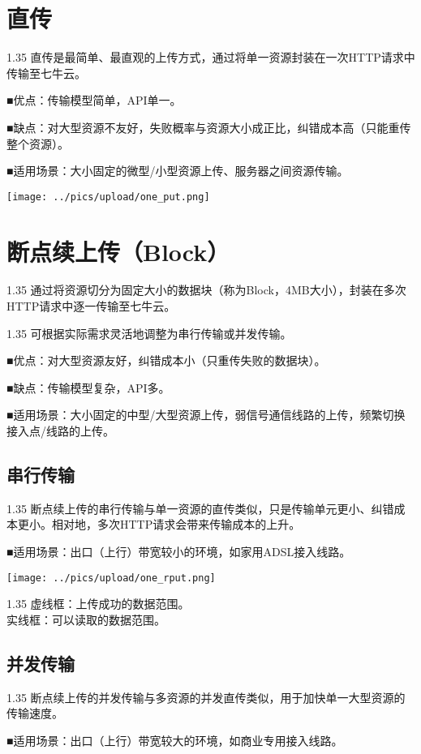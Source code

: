 \documentclass[11pt, oneside]{book}
\newcommand{\qpara}[1]{
\vspace{0.2em}
\begin{spacing}{1.35}
\noindent
#1\par
\end{spacing}
\vspace{0.2em}
}
\newcommand{\qblock}[1]{
\vspace{0.1em}
\noindent
#1\par
\vspace{0.1em}
}
\begin{document}
\section{直传}

\qpara{直传是最简单、最直观的上传方式，通过将单一资源封装在一次HTTP请求中传输至七牛云。}
\qblock{■\thinspace 优点：传输模型简单，API单一。}
\qblock{■\thinspace 缺点：对大型资源不友好，失败概率与资源大小成正比，纠错成本高（只能重传整个资源）。}
\qblock{■\thinspace 适用场景：大小固定的微型/小型资源上传、服务器之间资源传输。}

\begin{center}
\texttt{[image: ../pics/upload/one\_put.png]}
\end{center}

\section{断点续上传（Block）}

\qpara{通过将资源切分为固定大小的数据块（称为Block，4MB大小），封装在多次HTTP请求中逐一传输至七牛云。}
\qpara{可根据实际需求灵活地调整为串行传输或并发传输。}
\qblock{■\thinspace 优点：对大型资源友好，纠错成本小（只重传失败的数据块）。}
\qblock{■\thinspace 缺点：传输模型复杂，API多。}
\qblock{■\thinspace 适用场景：大小固定的中型/大型资源上传，弱信号通信线路的上传，频繁切换接入点/线路的上传。}

\subsection{串行传输}

\qpara{断点续上传的串行传输与单一资源的直传类似，只是传输单元更小、纠错成本更小。相对地，多次HTTP请求会带来传输成本的上升。}
\qblock{■\thinspace 适用场景：出口（上行）带宽较小的环境，如家用ADSL接入线路。}

\begin{center}
\texttt{[image: ../pics/upload/one\_rput.png]}
\end{center}

\qpara{虚线框：上传成功的数据范围。 \\ 实线框：可以读取的数据范围。}

\subsection{并发传输}

\qpara{断点续上传的并发传输与多资源的并发直传类似，用于加快单一大型资源的传输速度。}
\qblock{■\thinspace 适用场景：出口（上行）带宽较大的环境，如商业专用接入线路。}
\end{document}
